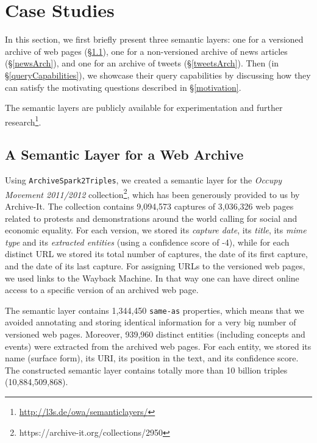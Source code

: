 \documentclass{libtex/sig-alternate-05-2015}
\newcommand{\tool}[0]{{\tt ArchiveSpark2Triples}}
\begin{document}
\section{Case Studies}
\label{sec:casestudies}

In this section, we first briefly present three semantic layers:
one for a versioned archive of web pages (\S \ref{webArch}),
one for a non-versioned archive of news articles (\S \ref{newsArch}), and
one for an archive of tweets (\S \ref{tweetsArch}).
Then (in \S \ref{queryCapabilities}), we showcase their query capabilities by discussing
how they can satisfy the motivating questions
described in \S \ref{motivation}.

The semantic layers are publicly
available for experimentation and further research\footnote{\url{http://l3s.de/owa/semanticlayers/}}.

\subsection{A Semantic Layer for a Web Archive}
\label{webArch}
Using \tool, we created a semantic layer
for the
\textit{Occupy Movement 2011/2012} collection\footnote{{https://archive-it.org/collections/2950}},
which has been generously provided to us by Archive-It.
The collection contains 9,094,573 captures of 3,036,326 web pages related to
protests and demonstrations around the world calling for social and economic equality.
For each version, we stored its {\em capture date},
its {\em title}, its {\em mime type} and its {\em extracted entities}
(using a confidence score of -4),
while for each distinct URL we stored its total number of captures,
the date of its first capture, and the date of its last capture.
For assigning URLs to the versioned web pages,
we used links to the Wayback Machine.
In that way one can have direct online access to a specific version
of an archived web page.

The semantic layer contains 1,344,450 {\tt same-as} properties,
which means that we avoided annotating and storing identical information
for a very big number of versioned web pages.
Moreover, 939,960 distinct entities (including concepts and events)
were extracted from the archived web pages.
For each entity, we stored its name (surface form),
its URI, its position in the text, and its confidence score.
The constructed semantic layer contains totally
more than 10 billion triples (10,884,509,868).
\end{document}
